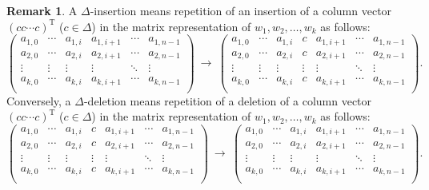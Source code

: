 \documentclass{article}
\theoremstyle{definition}
\newtheorem{remark}[theorem]{Remark}
\begin{document}
\begin{remark}
A $\Delta$-insertion means repetition of an insertion of a column vector $(cc \cdots c)^{\mathrm{T}}$ ($c \in \Delta$) in the matrix representation of $w_1, w_2, \dots, w_k$ as follows:
\[
\begin{pmatrix}
a_{1,0} & \cdots & a_{1,i} & a_{1,i+1} & \cdots & a_{1,n-1} \\
a_{2,0} & \cdots & a_{2,i} & a_{2,i+1} & \cdots & a_{2,n-1} \\
\vdots & \vdots & \vdots & \vdots & \ddots & \vdots \\
a_{k,0} & \cdots & a_{k,i} & a_{k,i+1} & \cdots & a_{k,n-1} \\
\end{pmatrix}
~\rightarrow~
\begin{pmatrix}
a_{1,0} & \cdots & a_{1,i} & c & a_{1,i+1} & \cdots & a_{1,n-1} \\
a_{2,0} & \cdots & a_{2,i} & c & a_{2,i+1} & \cdots & a_{2,n-1} \\
\vdots & \vdots & \vdots & \vdots & \vdots & \ddots & \vdots \\
a_{k,0} & \cdots & a_{k,i} & c & a_{k,i+1} & \cdots & a_{k,n-1} \\
\end{pmatrix}.
\]
Conversely, a $\Delta$-deletion means repetition of a deletion of a column vector $(cc \cdots c)^{\mathrm{T}}$ ($c \in \Delta$) in the matrix representation of $w_1, w_2, \dots, w_k$ as follows:
\[
\begin{pmatrix}
a_{1,0} & \cdots & a_{1,i} & c & a_{1,i+1} & \cdots & a_{1,n-1} \\
a_{2,0} & \cdots & a_{2,i} & c & a_{2,i+1} & \cdots & a_{2,n-1} \\
\vdots & \vdots & \vdots & \vdots & \vdots & \ddots & \vdots \\
a_{k,0} & \cdots & a_{k,i} & c & a_{k,i+1} & \cdots & a_{k,n-1} \\
\end{pmatrix}
~\rightarrow~
\begin{pmatrix}
a_{1,0} & \cdots & a_{1,i} & a_{1,i+1} & \cdots & a_{1,n-1} \\
a_{2,0} & \cdots & a_{2,i} & a_{2,i+1} & \cdots & a_{2,n-1} \\
\vdots & \vdots & \vdots & \vdots & \ddots & \vdots \\
a_{k,0} & \cdots & a_{k,i} & a_{k,i+1} & \cdots & a_{k,n-1} \\
\end{pmatrix}.
\]
\end{remark}
\end{document}

